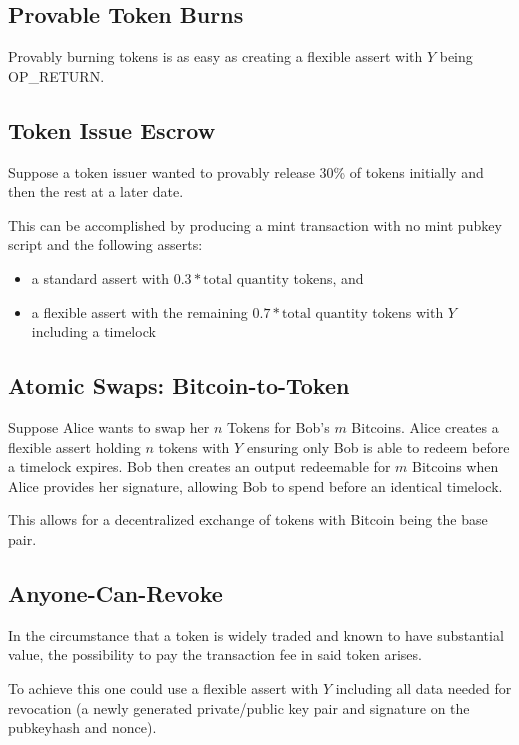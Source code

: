 \documentclass[9pt,oneside]{amsart}
\begin{document}
\begin{multicols}{2}
\subsection{Provable Token Burns}
Provably burning tokens is as easy as creating a flexible assert with $Y$ being OP\_RETURN.
\subsection{Token Issue Escrow}
Suppose a token issuer wanted to provably release 30\% of tokens initially and then the rest at a later date.

This can be accomplished by producing a mint transaction with no mint pubkey script and the following asserts:
\begin{itemize}
    \item a standard assert with $0.3*\text{total quantity}$ tokens, and
    \item a flexible assert with the remaining $0.7*\text{total quantity}$ tokens with $Y$ including a timelock
\end{itemize}

\subsection{Atomic Swaps: Bitcoin-to-Token}
Suppose Alice wants to swap her $n$ Tokens for Bob's $m$ Bitcoins. Alice creates a flexible assert holding $n$ tokens with $Y$ ensuring only Bob is able to redeem before a timelock expires. Bob then creates an output redeemable for $m$ Bitcoins when Alice provides her signature, allowing Bob to spend before an identical timelock.

This allows for a decentralized exchange of tokens with Bitcoin being the base pair.

\subsection{Anyone-Can-Revoke}
In the circumstance that a token is widely traded and known to have substantial value, the possibility to pay the transaction fee in said token arises.

To achieve this one could use a flexible assert with $Y$ including all data needed for revocation (a newly generated private/public key pair and signature on the pubkeyhash and nonce).

\end{multicols}
\end{document}
